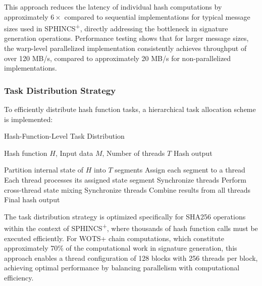 \documentclass[journal]{IEEEtran}
\begin{document}
This approach reduces the latency of individual hash computations by approximately $6\times$ compared to sequential implementations for typical message sizes used in SPHINCS\textsuperscript{+}, directly addressing the bottleneck in signature generation operations. Performance testing shows that for larger message sizes, the warp-level parallelized implementation consistently achieves throughput of over 120 MB/s, compared to approximately 20 MB/s for non-parallelized implementations.

\subsubsection{Task Distribution Strategy}

To efficiently distribute hash function tasks, a hierarchical task allocation scheme is implemented:

\begin{algorithm}
  \caption{Hash-Function-Level Task Distribution}
  \begin{algorithmic}[1]
    \REQUIRE Hash function $H$, Input data $M$, Number of threads $T$
    \ENSURE Hash output

    \STATE Partition internal state of $H$ into $T$ segments
    \STATE Assign each segment to a thread
    \STATE Each thread processes its assigned state segment
    \STATE Synchronize threads
    \STATE Perform cross-thread state mixing
    \STATE Synchronize threads
    \ENDFOR
    \STATE Combine results from all threads
    \RETURN Final hash output
  \end{algorithmic}
\end{algorithm}

The task distribution strategy is optimized specifically for SHA256 operations within the context of SPHINCS\textsuperscript{+}, where thousands of hash function calls must be executed efficiently. For WOTS+ chain computations, which constitute approximately 70\% of the computational work in signature generation, this approach enables a thread configuration of 128 blocks with 256 threads per block, achieving optimal performance by balancing parallelism with computational efficiency.

\end{document}
